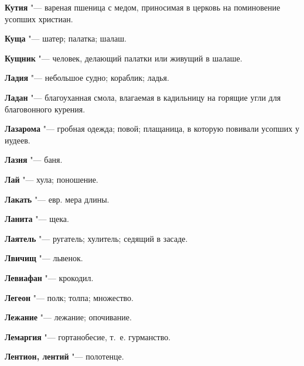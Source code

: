 \begin{mymulticols}{2}
\noindent\textbf{Кутия} "--- вареная пшеница с медом, приносимая в церковь на поминовение усопших христиан. 




\noindent\textbf{Куща} "--- шатер; палатка; шалаш. 




\noindent\textbf{Кущник} "--- человек, делающий палатки или живущий в шалаше. 




\bukvaending






\noindent\textbf{Ладия} "--- небольшое судно; кораблик; ладья. 




\noindent\textbf{Ладан} "--- благоуханная смола, влагаемая в кадильницу на горящие угли для благовонного курения. 




\noindent\textbf{Лазарома} "--- гробная одежда; повой; плащаница, в которую повивали усопших у иудеев. 




\noindent\textbf{Лазня} "--- баня. 




\noindent\textbf{Лай} "--- хула; поношение. 




\noindent\textbf{Лакать} "--- евр. мера длины. 




\noindent\textbf{Ланита} "--- щека. 




\noindent\textbf{Лаятель} "--- ругатель; хулитель; седящий в засаде. 




\noindent\textbf{Лвичищ} "--- львенок. 




\noindent\textbf{Левиафан} "--- крокодил. 




\noindent\textbf{Легеон} "--- полк; толпа; множество. 




\noindent\textbf{Лежание} "--- лежание; опочивание. 




\noindent\textbf{Лемаргия} "--- гортанобесие, т.~е. гурманство. 




\noindent\textbf{Лентион, лентий} "--- полотенце. 





\end{mymulticols}
